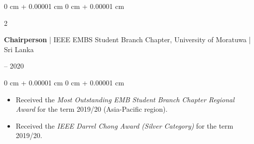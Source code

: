 \documentclass[10pt, letterpaper]{article}
\newenvironment{highlights}{
    \begin{itemize}[
        topsep=0.10 cm,
        parsep=0.10 cm,
        partopsep=0pt,
        itemsep=0pt,
        leftmargin=0 cm + 10pt
    ]
}{
    \end{itemize}
} %
\newenvironment{onecolentry}{
    \begin{adjustwidth}{
        0 cm + 0.00001 cm
    }{
        0 cm + 0.00001 cm
    }
}{
    \end{adjustwidth}
} %
\newenvironment{twocolentry}[2][]{
    \onecolentry
    \def\secondColumn{#2}
    \setcolumnwidth{\fill, 4.5 cm}
    \begin{paracol}{2}
}{
    \switchcolumn \raggedleft \secondColumn\strut
    \end{paracol}
    \endonecolentry
} %
\begin{document}
    \vspace{0.2 cm}

    \begin{twocolentry}{2019 -- 2020}
    \textbf{Chairperson} | IEEE EMBS Student Branch Chapter, University of Moratuwa | Sri Lanka
    \end{twocolentry}
    \vspace{0.10 cm}
    \begin{onecolentry}
        \begin{highlights}
            \item Received the \textit{Most Outstanding EMB Student Branch Chapter Regional Award} for the term 2019/20 (Asia-Pacific region).
            \item Received the \textit{IEEE Darrel Chong Award (Silver Category)} for the term 2019/20.
        \end{highlights}
    \end{onecolentry}
\end{document}
